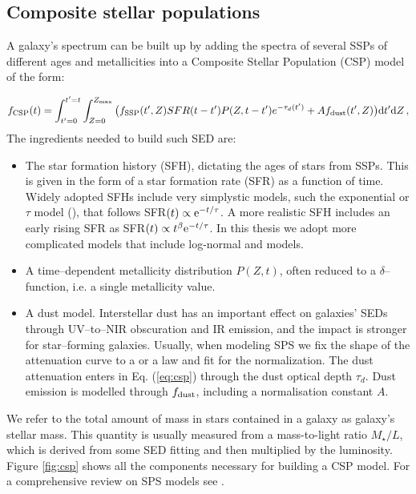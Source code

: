 \subsection{Composite stellar populations}

A galaxy's spectrum can be built up by adding the spectra of several SSPs of different ages and metallicities into a Composite Stellar Population (CSP) model of the form:

\begin{equation}
f_{\rm CSP} (t) = \int^{t'=t}_{t'=0} \int^{Z_{\rm max}}_{Z=0} \big(  f_{\rm SSP}(t',Z)  SFR(t-t')P(Z,t-t')e^{-\tau_d(t')}+Af_{\rm dust}(t',Z) \big){\rm d} t' {\rm d} Z\, ,\label{eq:csp}
\end{equation}
The ingredients needed to build such SED are:
\begin{itemize}
\item The star formation history (SFH), dictating the ages of stars from SSPs. This is given in the form of a star formation rate (SFR) as a function of time. Widely adopted SFHs include very simplystic models, such the exponential or $\tau$ model (\citealt{schmidt}), that follows SFR$(t)\propto {\rm e}^{-t/\tau}$. A more realistic SFH includes an early rising SFR as SFR$(t)\propto t^\beta {\rm e}^{-t/\tau}$. In this thesis we adopt more complicated models that include log-normal and \citet{simha} models.
\item A time--dependent metallicity distribution $P(Z,t)$, often reduced to a $\delta$--function, i.e. a single metallicity value.
\item A dust model. Interstellar dust has an important effect on galaxies' SEDs through UV--to--NIR obscuration and IR emission, and the impact is stronger for star--forming galaxies. Usually, when modeling SPS we fix the shape of the attenuation curve to a \citet{calzetti} or a \citet{charlotfall} law and fit for the normalization. The dust attenuation enters in Eq. (\ref{eq:csp}) through the dust optical depth $\tau_d$. Dust emission is modelled through $f_{\rm dust}$, including a normalisation constant $A$.
\end{itemize}
We refer to the total amount of mass in stars contained in a galaxy as galaxy's stellar mass. This quantity is usually measured from a mass-to-light ratio $M_\star/L$, which is derived from some SED fitting and then multiplied by the luminosity.
Figure \ref{fig:csp} shows all the components necessary for building a CSP model. For a comprehensive review on SPS models see \citet{conroy}.

